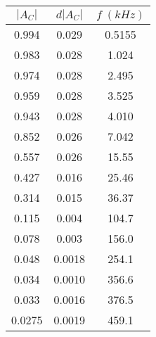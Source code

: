 \begin{tabular}{cc|c}
\toprule
$|A_{C}|$ & $d|A_{C}|$ & $f \; (kHz)$ \\
\midrule
 0.994 &   0.029 &       0.5155 \\
 0.983 &   0.028 &       1.024 \\
 0.974 &   0.028 &       2.495 \\
 0.959 &   0.028 &       3.525 \\
 0.943 &   0.028 &       4.010 \\
 0.852 &   0.026 &       7.042 \\
 0.557 &   0.026 &      15.55 \\
 0.427 &   0.016 &      25.46 \\
 0.314 &   0.015 &      36.37 \\
 0.115 &   0.004 &     104.7 \\
 0.078 &   0.003 &     156.0 \\
 0.048 &   0.0018 &     254.1 \\
 0.034 &   0.0010 &     356.6 \\
 0.033 &   0.0016 &     376.5 \\
 0.0275 &  0.0019 &     459.1 \\
\bottomrule
\end{tabular}
